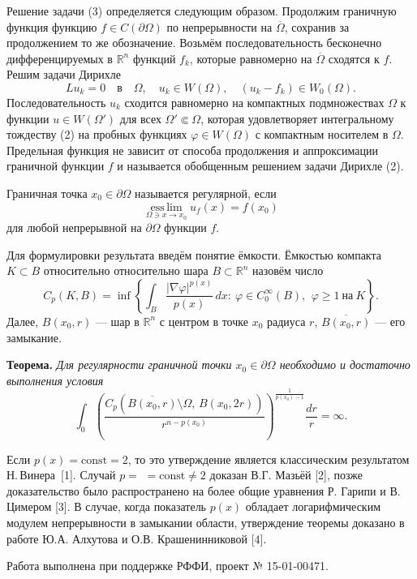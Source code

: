 Решение задачи (3) определяется следующим образом. Продолжим граничную функция функцию $f\in C(\partial \Omega)$ по непрерывности на $\overline{\Omega}$, сохранив за продолжением то же обозначение. Возьмём последовательность бесконечно дифференцируемых в $\mathbb{R}^n$ функций $f_k$, которые равномерно на $\overline{\Omega}$ сходятся к $f$. Решим задачи Дирихле
$$
Lu_k=0 \quad\text{в}\quad \Omega, \quad u_k \in W(\Omega), \quad (u_k-f_k)\in W_0(\Omega).
$$
Последовательность $u_k$ сходится равномерно  на компактных подмножествах $\Omega$ к функции $u\in W(\Omega')$ для всех $\Omega'\Subset \Omega$, которая удовлетворяет интегральному тождеству (2) на пробных функциях $\varphi \in W(\Omega)$ с компактным носителем в $\Omega$. Предельная функция не зависит от способа продолжения и аппроксимации граничной функции $f$ и называется обобщенным решением задачи Дирихле (2).

Граничная точка $x_0\in \partial \Omega$ называется регулярной, если
$$
\mathop{\mathrm{ess\,lim}}\limits_{\Omega \ni x\to x_0} u_f(x)= f(x_0)
$$
для любой непрерывной на $\partial \Omega$ функции $f$.

Для формулировки результата введём понятие ёмкости. Ёмкостью компакта $K\subset B$ относительно относительно шара $B\subset \mathbb{R}^n$ назовём число
$$
C_p (K, B)=\inf \left\{ \int_B \frac{|\nabla \varphi|^{p(x)}}{p(x)}\,dx:\ \varphi\in C_0^\infty(B),\ \,\varphi\geq 1\ \text{на}\ K \right\}.
$$
Далее, $B(x_0,r)$ --- шар в $\mathbb{R}^n$ с центром в точке $x_0$ радиуса $r$, $\overline{B(x_0,r)}$ --- его замыкание.

{\bf Теорема.} {\it Для регулярности граничной точки $x_0\in \partial \Omega$ необходимо и достаточно выполнения условия
$$
\int_0 \left( \frac{C_p \left(\overline{B(x_0,r)}\setminus \Omega,\, B(x_0,2r) \right)}{r^{n-p(x_0)}} \right)^\frac{1}{p(x_0)-1}\frac{dr}{r}=\infty.
$$
}

Если $p(x)=\mathrm{const}=2$, то это утверждение является классическим результатом Н.\,Винера~[1].
Случай
$p=$
\linebreak
$= \mathrm{const}\neq2$ доказан В.Г. Мазьёй [2], позже доказательство было распространено на более общие уравнения Р. Гарипи и В. Цимером [3]. В случае, когда показатель $p(x)$ обладает логарифмическим модулем непрерывности в замыкании области, утверждение теоремы  доказано в работе Ю.А. Алхутова и О.В. Крашенинниковой [4].

Работа выполнена при поддержке РФФИ, проект № 15-01-00471. %

